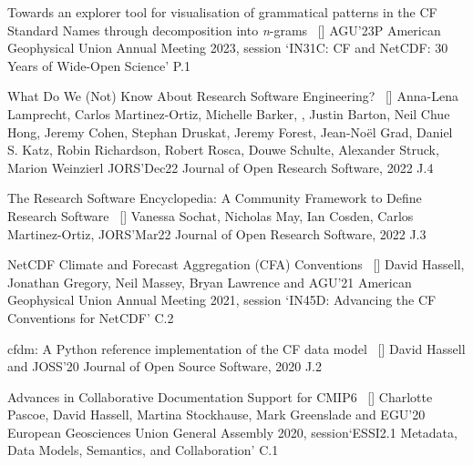 \begin{publications}

\publication
	{Towards an explorer tool for visualisation of grammatical patterns in the CF Standard Names through decomposition into \textit{n}-grams}{~ [\href{https://figshare.com/articles/poster/Towards_an_explorer_tool_for_visualisation_of_grammatical_patterns_in_the_CF_Standard_Names_through_decomposition_into_i_n_i_-grams/24750393?file=43484889}{\small{\linkSymbol}}]}
	{\underline{}}
	{AGU'23P} {American Geophysical Union Annual Meeting 2023, session `IN31C: CF and NetCDF: 30 Years of Wide-Open Science'} {P.1}

\publication
	{What Do We (Not) Know About Research Software Engineering?}{~ [\href{https://openresearchsoftware.metajnl.com/articles/10.5334/jors.384}{\small{\linkSymbol}}]}
	{Anna-Lena Lamprecht, Carlos Martinez-Ortiz, Michelle Barker, \underline{}, Justin Barton, Neil Chue Hong, Jeremy Cohen, Stephan Druskat, Jeremy Forest, Jean-Noël Grad, Daniel S. Katz, Robin Richardson, Robert Rosca, Douwe Schulte, Alexander Struck, Marion Weinzierl}
	{JORS'Dec22} {Journal of Open Research Software, 2022} {J.4}

\publication
	{The Research Software Encyclopedia: A Community Framework to Define Research Software}{~ [\href{https://openresearchsoftware.metajnl.com/articles/10.5334/jors.359}{\small{\linkSymbol}}]}
	{Vanessa Sochat, Nicholas May, Ian Cosden, Carlos Martinez-Ortiz, \underline{}}
	{JORS'Mar22} {Journal of Open Research Software, 2022} {J.3}

\publication
	{NetCDF Climate and Forecast Aggregation (CFA) Conventions}{~ [\href{https://ui.adsabs.harvard.edu/abs/2021AGUFMIN45D0483H}{\small{\linkSymbol}}]}
	{David Hassell, Jonathan Gregory, Neil Massey, Bryan Lawrence and \underline{}}
	{AGU'21} {American Geophysical Union Annual Meeting 2021, session `IN45D: Advancing the CF Conventions for NetCDF'} {C.2}

\publication
	{cfdm: A Python reference implementation of the CF data model}{~ [\href{https://joss.theoj.org/papers/10.21105/joss.02717}{\small{\linkSymbol}}]}
	{David Hassell and \underline{}}
	{JOSS'20} {Journal of Open Source Software, 2020} {J.2}

\publication
	{Advances in Collaborative Documentation Support for CMIP6}{~ [\href{https://zenodo.org/records/3928319}{\small{\linkSymbol}}]}
	{Charlotte Pascoe, David Hassell, Martina Stockhause, Mark Greenslade and \underline{}}
	{EGU'20} {European Geosciences Union General Assembly 2020, session\newline `ESSI2.1 Metadata, Data Models, Semantics, and Collaboration'} {C.1}


\end{publications}
